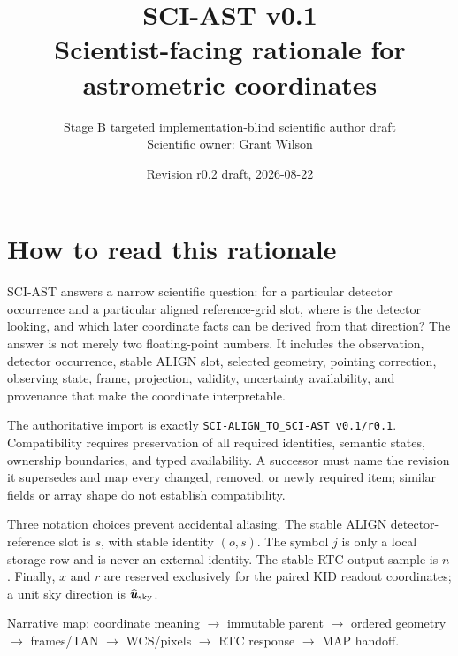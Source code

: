\documentclass[10pt]{article}
\title{\vspace{-1.5em}\textcolor{astnavy}{\textbf{SCI-AST v0.1}}\\
\large Scientist-facing rationale for astrometric coordinates}
\author{Stage B targeted implementation-blind scientific author draft\\
Scientific owner: Grant Wilson}
\date{Revision r0.2 draft, 2026-08-22}
\begin{document}
\maketitle
\thispagestyle{empty}
\begin{center}
\end{center}

\section*{How to read this rationale}
SCI-AST answers a narrow scientific question: for a particular detector
occurrence and a particular aligned reference-grid slot, where is the detector
looking, and which later coordinate facts can be derived from that direction?
The answer is not merely two floating-point numbers. It includes the
observation, detector occurrence, stable ALIGN slot, selected geometry,
pointing correction, observing state, frame, projection, validity, uncertainty
availability, and provenance that make the coordinate interpretable.

The authoritative import is exactly
\nolinkurl{SCI-ALIGN_TO_SCI-AST v0.1/r0.1}. Compatibility requires preservation
of all required identities, semantic states, ownership boundaries, and typed
availability. A successor must name the revision it supersedes and map every
changed, removed, or newly required item; similar fields or array shape do not
establish compatibility.

Three notation choices prevent accidental aliasing. The stable ALIGN
detector-reference slot is $s$, with stable identity $(o,s)$. The symbol $j$
is only a local storage row and is never an external identity. The stable RTC
output sample is $n$. Finally, $x$ and $r$ are reserved exclusively for the
paired KID readout coordinates; a unit sky direction is
$\widehat{\boldsymbol u}_{\rm sky}$.
\vfill
\begin{center}\small
Narrative map: coordinate meaning $\rightarrow$ immutable parent $\rightarrow$
ordered geometry $\rightarrow$ frames/TAN $\rightarrow$ WCS/pixels
$\rightarrow$ RTC response $\rightarrow$ MAP handoff.
\end{center}
\end{document}
